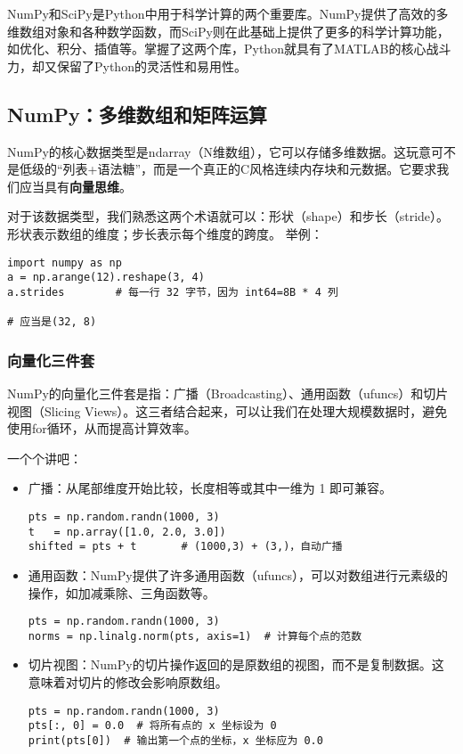 \documentclass[../main.tex]{subfiles}
\begin{document}
NumPy和SciPy是Python中用于科学计算的两个重要库。NumPy提供了高效的多维数组对象和各种数学函数，而SciPy则在此基础上提供了更多的科学计算功能，如优化、积分、插值等。掌握了这两个库，Python就具有了MATLAB的核心战斗力，却又保留了Python的灵活性和易用性。

\subsection{NumPy：多维数组和矩阵运算}

NumPy的核心数据类型是ndarray（N维数组），它可以存储多维数据。这玩意可不是低级的“列表+语法糖”，而是一个真正的C风格连续内存块和元数据。它要求我们应当具有\textbf{向量思维}。

对于该数据类型，我们熟悉这两个术语就可以：形状（shape）和步长（stride）。形状表示数组的维度；步长表示每个维度的跨度。
举例：
\begin{lstlisting}
import numpy as np
a = np.arange(12).reshape(3, 4)
a.strides        # 每一行 32 字节，因为 int64=8B * 4 列

# 应当是(32, 8)
\end{lstlisting}

\subsubsection{向量化三件套}

NumPy的向量化三件套是指：广播（Broadcasting）、通用函数（ufuncs）和切片视图（Slicing Views）。这三者结合起来，可以让我们在处理大规模数据时，避免使用for循环，从而提高计算效率。

一个个讲吧：
\begin{itemize}
  \item 广播：从尾部维度开始比较，长度相等或其中一维为 1 即可兼容。
    \begin{lstlisting}
pts = np.random.randn(1000, 3)
t   = np.array([1.0, 2.0, 3.0])
shifted = pts + t       # (1000,3) + (3,)，自动广播
    \end{lstlisting}
  \item 通用函数：NumPy提供了许多通用函数（ufuncs），可以对数组进行元素级的操作，如加减乘除、三角函数等。
    \begin{lstlisting}
pts = np.random.randn(1000, 3)
norms = np.linalg.norm(pts, axis=1)  # 计算每个点的范数
\end{lstlisting}
  \item 切片视图：NumPy的切片操作返回的是原数组的视图，而不是复制数据。这意味着对切片的修改会影响原数组。
    \begin{lstlisting}
pts = np.random.randn(1000, 3)
pts[:, 0] = 0.0  # 将所有点的 x 坐标设为 0
print(pts[0])  # 输出第一个点的坐标，x 坐标应为 0.0
    \end{lstlisting}
\end{itemize}
\end{document}
